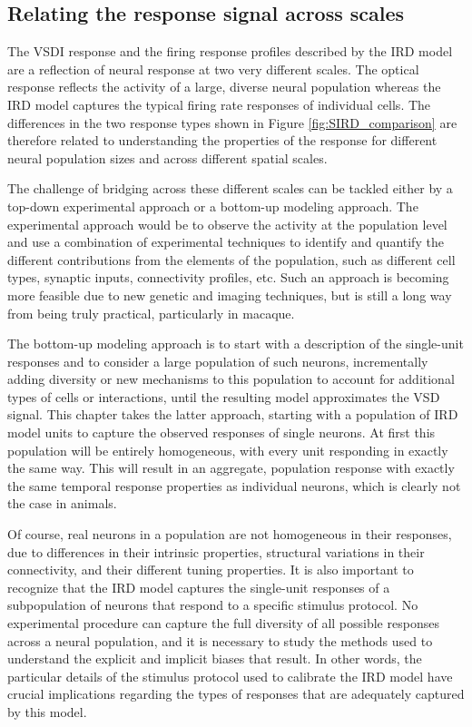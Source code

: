 \documentclass[phd,ianc,twoside]{infthesis}
\begin{document}
\subsection{Relating the response signal across scales}
\label{section:response_across_scales}
The VSDI response and the firing response profiles described by the IRD
model are a reflection of neural response at two very different
scales. The optical response reflects the activity of a large, diverse
neural population whereas the IRD model captures the typical firing rate
responses of individual cells. The differences in the two response types
shown in Figure \ref{fig:SIRD_comparison} are therefore related to
understanding the properties of the response for different neural
population sizes and across different spatial scales.

The challenge of bridging across these different scales can be tackled
either by a top-down experimental approach or a bottom-up modeling
approach. The experimental approach would be to observe the activity at
the population level and use a combination of experimental techniques to
identify and quantify the different contributions from the elements of
the population, such as different cell types, synaptic inputs,
connectivity profiles, etc.  Such an approach is becoming more
feasible due to new genetic and imaging techniques, but is still a
long way from being truly practical, particularly in macaque.

The bottom-up modeling approach is to start with a description of the
single-unit responses and to consider a large population of such
neurons, incrementally adding diversity or new mechanisms to this
population to account for additional types of cells or interactions,
until the resulting model approximates the VSD signal.  This chapter
takes the latter approach, starting with a population of IRD model
units to capture the observed responses of single neurons.  At first
this population will be entirely homogeneous, with every unit
responding in exactly the same way. This will result in an aggregate,
population response with exactly the same temporal response properties
as individual neurons, which is clearly not the case in animals.

Of course, real neurons in a population are not homogeneous in their responses, due
to differences in their intrinsic properties, structural variations in
their connectivity, and their different tuning properties. It is
also important to recognize that the IRD model captures the single-unit
responses of a subpopulation of neurons that respond to a specific
stimulus protocol. No experimental procedure can capture the full
diversity of all possible responses across a neural population, and it is
necessary to study the methods used to understand the explicit and
implicit biases that result. In other words,
the particular details of the stimulus protocol used to calibrate the
IRD model have crucial implications regarding the types of responses that
are adequately captured by this model.
\end{document}
